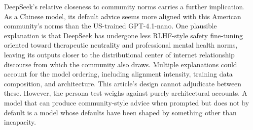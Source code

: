 DeepSeek's relative closeness to community norms carries a further implication. As a Chinese model, its default advice seems more aligned with this American community's norms than the US-trained GPT-4.1-nano. One plausible explanation is that DeepSeek has undergone less RLHF-style safety fine-tuning oriented toward therapeutic neutrality and professional mental health norms, leaving its outputs closer to the distributional center of internet relationship discourse from which the community also draws. Multiple explanations could account for the model ordering, including alignment intensity, training data composition, and architecture. This article's design cannot adjudicate between these. However, the persona test weighs against purely architectural accounts. A model that can produce community-style advice when prompted but does not by default is a model whose defaults have been shaped by something other than incapacity.